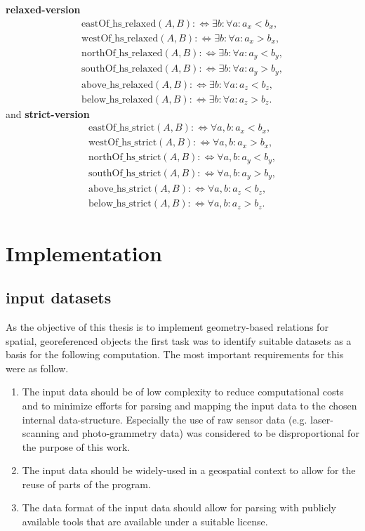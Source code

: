 \documentclass[paper=a4, fontsize=11pt]{scrartcl} %
\numberwithin{equation}{section} %
\numberwithin{figure}{section} %
\numberwithin{table}{section} %
\begin{document}
\textbf{relaxed-version}
\begin{align*}
  \mathrm{eastOf\_hs\_relaxed}(A,B) :\Leftrightarrow \exists b: \forall a: a_x<b_x,  \\
  \mathrm{westOf\_hs\_relaxed}(A,B) :\Leftrightarrow \exists b: \forall a: a_x>b_x,  \\
  \mathrm{northOf\_hs\_relaxed}(A,B) :\Leftrightarrow \exists b: \forall a: a_y<b_y, \\
  \mathrm{southOf\_hs\_relaxed}(A,B) :\Leftrightarrow \exists b: \forall a: a_y>b_y, \\
  \mathrm{above\_hs\_relaxed}(A,B) :\Leftrightarrow \exists b: \forall a: a_z<b_z,   \\
  \mathrm{below\_hs\_relaxed}(A,B) :\Leftrightarrow \exists b: \forall a: a_z>b_z.
\end{align*}
and
\textbf{strict-version}
\begin{align*}
  \mathrm{eastOf\_hs\_strict}(A,B) :\Leftrightarrow \forall a,b: a_x<b_x,  \\
  \mathrm{westOf\_hs\_strict}(A,B) :\Leftrightarrow \forall a,b: a_x>b_x,  \\
  \mathrm{northOf\_hs\_strict}(A,B) :\Leftrightarrow \forall a,b: a_y<b_y, \\
  \mathrm{southOf\_hs\_strict}(A,B) :\Leftrightarrow \forall a,b: a_y>b_y, \\
  \mathrm{above\_hs\_strict}(A,B) :\Leftrightarrow \forall a,b: a_z<b_z,   \\
  \mathrm{below\_hs\_strict}(A,B) :\Leftrightarrow \forall a,b: a_z>b_z. 
\end{align*}

\section{Implementation}\label{sec:implementation}

\subsection{input datasets}\label{sec:input-datasets}
As the objective of this thesis is to implement geometry-based relations for spatial, georeferenced objects the first task was to identify suitable datasets as a basis for the following computation. The most important requirements for this were as follow.
\begin{enumerate}
\item The input data should be of low complexity to reduce computational costs and to minimize efforts for parsing and mapping the input data to the chosen internal data-structure. Especially the use of raw sensor data (e.g. laser-scanning and photo-grammetry data) was considered to be disproportional for the purpose of this work.
\item The input data should be widely-used in a geospatial context to allow for the reuse of parts of the program.
\item The data format of the input data should allow for parsing with publicly available tools that are available under a suitable license. 
\end{enumerate}
\end{document}
